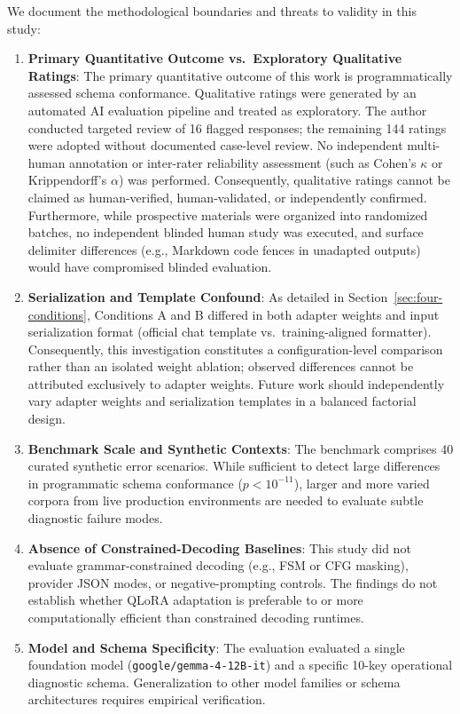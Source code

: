 \documentclass[11pt,a4paper]{article}
\begin{document}
We document the methodological boundaries and threats to validity in this study:
\begin{enumerate}
    \item \textbf{Primary Quantitative Outcome vs.\ Exploratory Qualitative Ratings}: The primary quantitative outcome of this work is programmatically assessed schema conformance. Qualitative ratings were generated by an automated AI evaluation pipeline and treated as exploratory. The author conducted targeted review of 16 flagged responses; the remaining 144 ratings were adopted without documented case-level review. No independent multi-human annotation or inter-rater reliability assessment (such as Cohen's $\kappa$ or Krippendorff's $\alpha$) was performed. Consequently, qualitative ratings cannot be claimed as human-verified, human-validated, or independently confirmed. Furthermore, while prospective materials were organized into randomized batches, no independent blinded human study was executed, and surface delimiter differences (e.g., Markdown code fences in unadapted outputs) would have compromised blinded evaluation.
    \item \textbf{Serialization and Template Confound}: As detailed in Section~\ref{sec:four-conditions}, Conditions A and B differed in both adapter weights and input serialization format (official chat template vs.\ training-aligned formatter). Consequently, this investigation constitutes a configuration-level comparison rather than an isolated weight ablation; observed differences cannot be attributed exclusively to adapter weights. Future work should independently vary adapter weights and serialization templates in a balanced factorial design.
    \item \textbf{Benchmark Scale and Synthetic Contexts}: The benchmark comprises 40 curated synthetic error scenarios. While sufficient to detect large differences in programmatic schema conformance ($p < 10^{-11}$), larger and more varied corpora from live production environments are needed to evaluate subtle diagnostic failure modes.
    \item \textbf{Absence of Constrained-Decoding Baselines}: This study did not evaluate grammar-constrained decoding (e.g., FSM or CFG masking), provider JSON modes, or negative-prompting controls. The findings do not establish whether QLoRA adaptation is preferable to or more computationally efficient than constrained decoding runtimes.
    \item \textbf{Model and Schema Specificity}: The evaluation evaluated a single foundation model (\texttt{google/gemma-4-12B-it}) and a specific 10-key operational diagnostic schema. Generalization to other model families or schema architectures requires empirical verification.
\end{enumerate}
\end{document}
